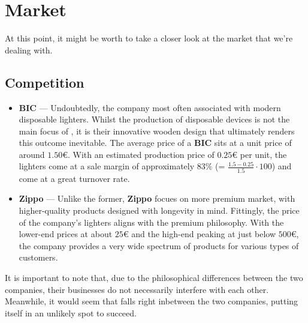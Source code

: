 \section{Market}
At this point, it might be worth to take a closer look at the market that we're dealing with.
\subsection{Competition}
\begin{itemize}
	\item \textbf{BIC} --- Undoubtedly, the company most often associated with modern disposable lighters.
		Whilst the production of disposable devices is not the main focus of {\fw}, it is their innovative
		wooden design that ultimately renders this outcome inevitable. The average price of a \textbf{BIC} sits
		at a unit price of around $1.50$\euro. With an estimated production price of $0.25${\euro} per unit,
		the lighters come at a sale margin of approximately $83\%$ (= $\frac{1.5 - 0.25}{1.5} \cdot 100$) and
		come at a great turnover rate.
	\item \textbf{Zippo} --- Unlike the former, \textbf{Zippo} focues on more premium market, with higher-quality
		products designed with longevity in mind. Fittingly, the price of the company's lighters aligns with the
		premium philosophy. With the lower-end prices at about $25${\euro} and the high-end peaking
		at just below $500${\euro}, the company provides a very wide spectrum of products for various types of
		customers.
\end{itemize}
It is important to note that, due to the philosophical differences between the two companies, their businesses do not
necessarily interfere with each other. Meanwhile, it would seem that {\fw} falls right inbetween the two companies,
putting itself in an unlikely spot to succeed.
